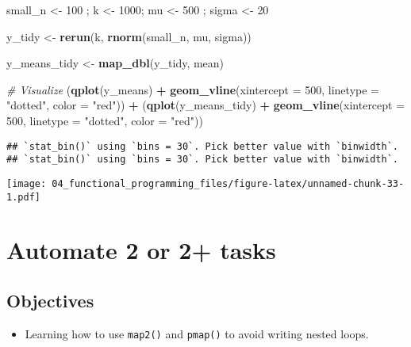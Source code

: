 \documentclass[
]{book}
\newenvironment{Shaded}{\begin{snugshade}}{\end{snugshade}}
\newcommand{\CommentTok}[1]{\textcolor[rgb]{0.56,0.35,0.01}{\textit{#1}}}
\newcommand{\DataTypeTok}[1]{\textcolor[rgb]{0.13,0.29,0.53}{#1}}
\newcommand{\DecValTok}[1]{\textcolor[rgb]{0.00,0.00,0.81}{#1}}
\newcommand{\KeywordTok}[1]{\textcolor[rgb]{0.13,0.29,0.53}{\textbf{#1}}}
\newcommand{\NormalTok}[1]{#1}
\newcommand{\OperatorTok}[1]{\textcolor[rgb]{0.81,0.36,0.00}{\textbf{#1}}}
\newcommand{\StringTok}[1]{\textcolor[rgb]{0.31,0.60,0.02}{#1}}
\providecommand{\tightlist}{%
  \setlength{\itemsep}{0pt}\setlength{\parskip}{0pt}}
\begin{document}
\begin{Shaded}
\begin{Highlighting}[]
\NormalTok{small\_n \textless{}{-}}\StringTok{ }\DecValTok{100}\NormalTok{ ; k \textless{}{-}}\StringTok{ }\DecValTok{1000}\NormalTok{; mu \textless{}{-}}\StringTok{ }\DecValTok{500}\NormalTok{ ; sigma \textless{}{-}}\StringTok{ }\DecValTok{20} 

\NormalTok{y\_tidy \textless{}{-}}\StringTok{ }\KeywordTok{rerun}\NormalTok{(k, }\KeywordTok{rnorm}\NormalTok{(small\_n, mu, sigma)) }

\NormalTok{y\_means\_tidy \textless{}{-}}\StringTok{ }\KeywordTok{map\_dbl}\NormalTok{(y\_tidy, mean)}

\CommentTok{\# Visualize }
\NormalTok{(}\KeywordTok{qplot}\NormalTok{(y\_means) }\OperatorTok{+}
\StringTok{   }\KeywordTok{geom\_vline}\NormalTok{(}\DataTypeTok{xintercept =} \DecValTok{500}\NormalTok{, }\DataTypeTok{linetype =} \StringTok{"dotted"}\NormalTok{, }\DataTypeTok{color =} \StringTok{"red"}\NormalTok{)) }\OperatorTok{+}
\NormalTok{(}\KeywordTok{qplot}\NormalTok{(y\_means\_tidy) }\OperatorTok{+}
\StringTok{   }\KeywordTok{geom\_vline}\NormalTok{(}\DataTypeTok{xintercept =} \DecValTok{500}\NormalTok{, }\DataTypeTok{linetype =} \StringTok{"dotted"}\NormalTok{, }\DataTypeTok{color =} \StringTok{"red"}\NormalTok{))}
\end{Highlighting}
\end{Shaded}

\begin{verbatim}
## `stat_bin()` using `bins = 30`. Pick better value with `binwidth`.
## `stat_bin()` using `bins = 30`. Pick better value with `binwidth`.
\end{verbatim}

\texttt{[image: 04\_functional\_programming\_files/figure-latex/unnamed-chunk-33-1.pdf]}

\hypertarget{map2}{%
\section{Automate 2 or 2+ tasks}\label{map2}}

\hypertarget{objectives-2}{%
\subsection{Objectives}\label{objectives-2}}

\begin{itemize}
\tightlist
\item
  Learning how to use \texttt{map2()} and \texttt{pmap()} to avoid writing nested loops.
\end{itemize}
\end{document}
